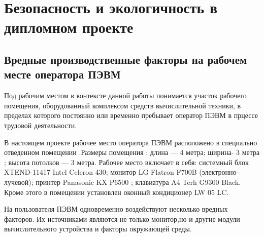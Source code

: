 \section{Безопасность и экологичность в дипломном проекте}

\subsection{Вредные производственные факторы на рабочем месте оператора ПЭВМ}
Под рабочим местом в контексте данной работы понимается участок рабочего
помещения, оборудованный комплексом средств вычислительной техники, в
пределах которого постоянно или временно пребывает оператор ПЭВМ в прцессе трудовой деятельности.


В настоящем проекте рабочее место оператора ПЭВМ расположено в 
специально отведенном помещении .Размеры помещения : длина — 4 метра;
ширина- 3 метра ; высота потолков — 3 метра. Рабочее место включает в себя:
системный блок XTEND-11417 Intel Celeron 430;  монитор LG Flatron F700B
(электронно-лучевой);  принтер  Panasonic KX P6500 ; клавиатура A4 Terh 
G9300 Black. Кроме этого в помещении установлен оконный кондиционер
LW 05 LC.

На пользователя ПЭВМ одновременно воздействуют несколько вредных факторов.
Их источниками являются не только монитор,но и другие модули вычислительного устройства
и факторы окружающей среды. 


